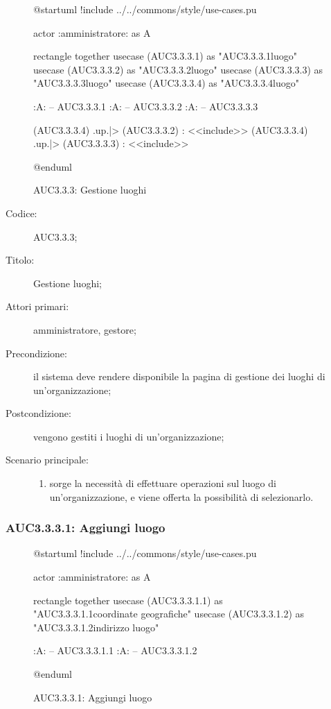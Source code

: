\documentclass[../../../analisi-dei-requisiti.tex]{subfiles}
\begin{document}
\begin{figure}[H]
  \centering
  \begin{plantuml}
  @startuml
  !include ../../commons/style/use-cases.pu

  actor :amministratore: as A

  rectangle {
    together {
      usecase (AUC3.3.3.1) as "AUC3.3.3.1\nAggiungi luogo"
      usecase (AUC3.3.3.2) as "AUC3.3.3.2\nEliminazione luogo"
      usecase (AUC3.3.3.3) as "AUC3.3.3.3\nModifica luogo"
    }
    usecase (AUC3.3.3.4) as "AUC3.3.3.4\nSeleziona luogo"
  }

  :A: -- AUC3.3.3.1
  :A: -- AUC3.3.3.2
  :A: -- AUC3.3.3.3

  (AUC3.3.3.4) .up.|> (AUC3.3.3.2) : <<include>>
  (AUC3.3.3.4) .up.|> (AUC3.3.3.3) : <<include>>

  @enduml
  \end{plantuml}
  \caption{AUC3.3.3: Gestione luoghi}%
  \label{fig:AUC3_3_3}
\end{figure}

\begin{description}
  \item[Codice:] AUC3.3.3;
  \item[Titolo:] Gestione luoghi;
  \item[Attori primari:] amministratore, gestore;
  \item[Precondizione:] il sistema deve rendere disponibile la pagina di gestione dei luoghi di un'organizzazione;
  \item[Postcondizione:] vengono gestiti i luoghi di un'organizzazione;
  \item[Scenario principale:]
  \begin{enumerate}
    \item sorge la necessità di effettuare operazioni sul luogo di un'organizzazione, e viene offerta la possibilità di selezionarlo.
  \end{enumerate}
\end{description}

\subsubsection{AUC3.3.3.1: Aggiungi luogo}%
\label{subs:AUC3.3.3.1}

\begin{figure}[H]
  \centering
  \begin{plantuml}
  @startuml
  !include ../../commons/style/use-cases.pu

  actor :amministratore: as A

  rectangle {
    together {
      usecase (AUC3.3.3.1.1) as "AUC3.3.3.1.1\nInserisci coordinate geografiche"
      usecase (AUC3.3.3.1.2) as "AUC3.3.3.1.2\nInserisci indirizzo luogo"
    }
  }

  :A: -- AUC3.3.3.1.1
  :A: -- AUC3.3.3.1.2

  @enduml
  \end{plantuml}
  \caption{AUC3.3.3.1: Aggiungi luogo}%
  \label{fig:AUC3_3_3_1}
\end{figure}
\end{document}
